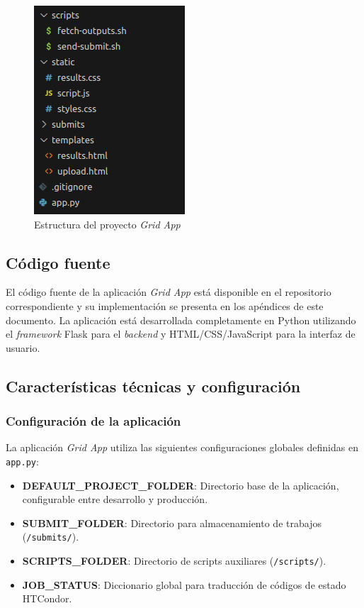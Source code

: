 \begin{figure}[H]
	\centering
	\includegraphics[scale=0.7]{tablas-images/pmv/estructura-proyecto-grid-app.png}
	\caption{Estructura del proyecto \textit{Grid App}}
	\label{fig:estructura-proyecto-grid-app}
\end{figure}

\subsection{Código fuente}
\noindent

El código fuente de la aplicación \textit{Grid App} está disponible en el repositorio correspondiente y su implementación se presenta en los apéndices de este documento. La aplicación está desarrollada completamente en Python utilizando el \textit{framework} Flask para el \textit{backend} y HTML/CSS/JavaScript para la interfaz de usuario.

\subsection{Características técnicas y configuración}
\noindent

\subsubsection{Configuración de la aplicación}
\noindent

La aplicación \textit{Grid App} utiliza las siguientes configuraciones globales definidas en \texttt{app.py}:

\begin{itemize}
	\item \textbf{DEFAULT\_PROJECT\_FOLDER}: Directorio base de la aplicación, configurable entre desarrollo y producción.
	\item \textbf{SUBMIT\_FOLDER}: Directorio para almacenamiento de trabajos (\texttt{/submits/}).
	\item \textbf{SCRIPTS\_FOLDER}: Directorio de scripts auxiliares (\texttt{/scripts/}).
	\item \textbf{JOB\_STATUS}: Diccionario global para traducción de códigos de estado HTCondor.
\end{itemize}

